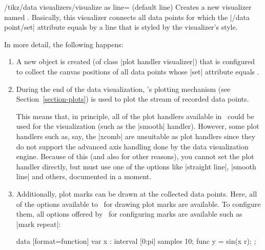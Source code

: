 \begin{key}{/tikz/data visualizers/visualize as line= (default line)}
  Creates a new visualizer named . Basically, 
  this visualizer connects all data points for which the
  |/data point/set| attribute equals  by
  a line that is styled by the visualizer's style.

  In more detail, the following happens:
  \begin{enumerate}
  \item A new object is created (of class |plot handler visualizer|)
    that is configured to collect the canvas positions of all data
    points whose |set| attribute equals .
  \item During the end of the data visualization, \pgfname's plotting
    mechanism (see Section~\ref{section-plots}) is used to plot the
    stream of recorded data points.

    This means that, in principle, all of the plot handlers available
    in \tikzname\ could be used for the visualization (such as the
    |smooth| handler). However, some plot handlers such as, say, the
    |xcomb| are unsuitable as plot handlers since they do not support
    the advanced axis handling done by the data visualization
    engine. Because of this (and also for other reasons), you cannot
    set the plot handler directly, but must use one of the options
    like |straight line|, |smooth line| and others, documented in a
    moment.
  \item Additionally, plot marks can be drawn at the collected data
    points. Here, all of the options available to \tikzname\ for
    drawing plot marks are available. To configure them, all options
    offered by \tikzname\ for  configuring marks are available such as
    |mark repeat|:  
\begin{codeexample}[width=7cm]
\tikz \datavisualization
 [scientific axes=clean, 
  visualize as line=my data,
  my data={style={mark=x, mark repeat=3}}]
data [format=function] {
  var x : interval [0:pi] samples 10;
  func y = sin(\value x r);
};
\end{codeexample}
  \end{enumerate}
  

\end{key}
